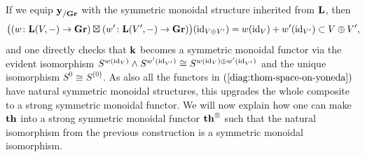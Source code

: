 \documentclass[reqno]{memo-l}
\theoremstyle{mythm}
\theoremstyle{definition}
\numberwithin{equation}{section}
\newcommand{\cat}[1]{\textbf{\textup{#1}}}
\newcommand{\id}{\textup{id}}
\let\smashp=\wedge
\begin{document}
If we equip $\cat{y}_{/\cat{Gr}}$ with the symmetric monoidal structure inherited from $\cat{L}$, then 
\[
    \big((w\colon\hskip0pt minus 1pt\cat{L}(V,-)\hskip0pt minus 1pt\to\hskip0pt minus 1pt\cat{Gr})\boxtimes (w'\hskip0pt minus .5pt\colon\hskip0pt minus 1pt\cat{L}(V',-)\hskip0pt minus 1pt\to\hskip0pt minus 1pt\cat{Gr})\big)(\id_{V\oplus V'})\hskip0pt minus .5pt=\hskip0pt minus .5ptw(\id_V)+w'(\id_{V'})\hskip0pt minus .5pt\subset\hskip0pt minus .5pt V\oplus V'\rlap,
\]
and one directly checks that $\cat{k}$ becomes a symmetric monoidal functor via the evident isomorphism $S^{w(\id_V)}\smashp S^{w'(\id_{V'})}\cong S^{w(\id_V)\oplus w'(\id_{V'})}$ and the unique isomorphism $S^0\cong S^{\{0\}}$. As also all the functors in $(\ref{diag:thom-space-on-yoneda})$ have natural symmetric monoidal structures, this upgrades the whole composite to a strong symmetric monoidal functor. We will now explain how one can make $\cat{th}$ into a strong symmetric monoidal functor $\cat{th}^\otimes$ such that the natural isomorphism from the previous construction is a symmetric monoidal isomorphism.
\end{document}

